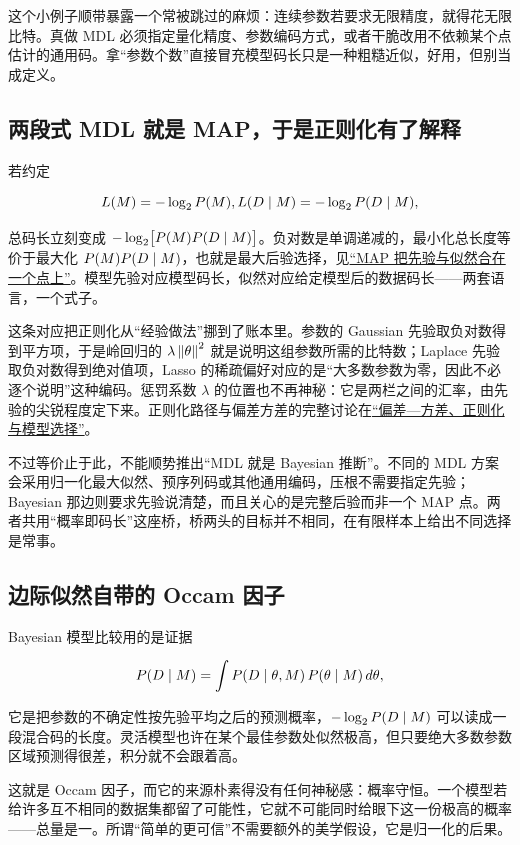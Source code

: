 这个小例子顺带暴露一个常被跳过的麻烦：连续参数若要求无限精度，就得花无限比特。真做 MDL 必须指定量化精度、参数编码方式，或者干脆改用不依赖某个点估计的通用码。拿``参数个数''直接冒充模型码长只是一种粗糙近似，好用，但别当成定义。

\subsection{两段式 MDL 就是 MAP，于是正则化有了解释}

若约定

\[
L(M)=-\log_2 P(M),\space L(D\mid M)=-\log_2 P(D\mid M),
\]

总码长立刻变成 \(-\log_2\bigl[P(M)P(D\mid M)\bigr]\)。负对数是单调递减的，最小化总长度等价于最大化 \(P(M)P(D\mid M)\)，也就是最大后验选择，见\hyperref[sec:11-Mathematical-Statistics/02-Point-Estimation/04]{``MAP 把先验与似然合在一个点上''}。模型先验对应模型码长，似然对应给定模型后的数据码长——两套语言，一个式子。

这条对应把正则化从``经验做法''挪到了账本里。参数的 Gaussian 先验取负对数得到平方项，于是岭回归的 \(\lambda\left\lVert\theta\right\rVert^2\) 就是说明这组参数所需的比特数；Laplace 先验取负对数得到绝对值项，Lasso 的稀疏偏好对应的是``大多数参数为零，因此不必逐个说明''这种编码。惩罚系数 \(\lambda\) 的位置也不再神秘：它是两栏之间的汇率，由先验的尖锐程度定下来。正则化路径与偏差方差的完整讨论在\hyperref[sec:11-Mathematical-Statistics/06-Resampling-and-Model-Selection/04]{``偏差---方差、正则化与模型选择''}。

不过等价止于此，不能顺势推出``MDL 就是 Bayesian 推断''。不同的 MDL 方案会采用归一化最大似然、预序列码或其他通用编码，压根不需要指定先验；Bayesian 那边则要求先验说清楚，而且关心的是完整后验而非一个 MAP 点。两者共用``概率即码长''这座桥，桥两头的目标并不相同，在有限样本上给出不同选择是常事。

\subsection{边际似然自带的 Occam 因子}

Bayesian 模型比较用的是证据

\[
P(D\mid M)=\int P(D\mid\theta,M)\,P(\theta\mid M)\,d\theta,
\]

它是把参数的不确定性按先验平均之后的预测概率，\(-\log_2 P(D\mid M)\) 可以读成一段混合码的长度。灵活模型也许在某个最佳参数处似然极高，但只要绝大多数参数区域预测得很差，积分就不会跟着高。

这就是 Occam 因子，而它的来源朴素得没有任何神秘感：概率守恒。一个模型若给许多互不相同的数据集都留了可能性，它就不可能同时给眼下这一份极高的概率——总量是一。所谓``简单的更可信''不需要额外的美学假设，它是归一化的后果。

